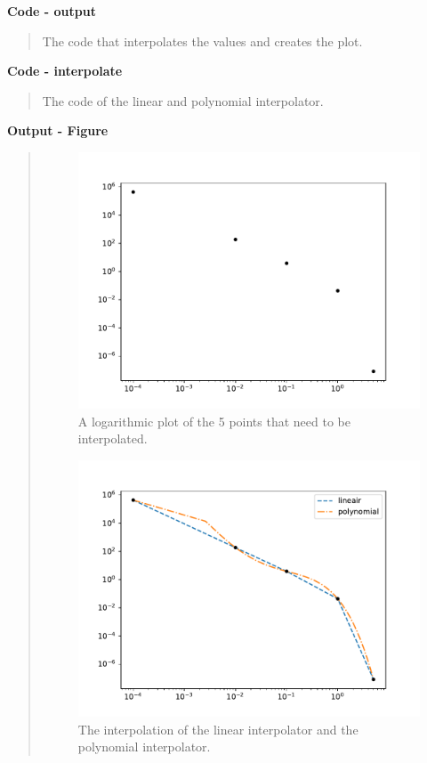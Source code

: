 \textbf{Code - output}
\begin{quote}
The code that interpolates the values and creates the plot.

\end{quote}

\textbf{Code - interpolate}
\begin{quote}
The code of the linear and polynomial interpolator.

\end{quote}
\newpage

\textbf{Output - Figure}
\begin{quote}
\begin{figure}[!ht]
\centering
\includegraphics[scale=0.7]{plots/points.pdf}
\caption{A logarithmic plot of the 5 points that need to be interpolated.}
\label{fig:points}
\end{figure}

\begin{figure}[!ht]
\centering
\includegraphics[scale=0.7]{plots/interpolate.pdf}
\caption{The interpolation of the linear interpolator and the polynomial interpolator.}
\label{fig:interpolate}
\end{figure}
\end{quote}
\newpage


 









